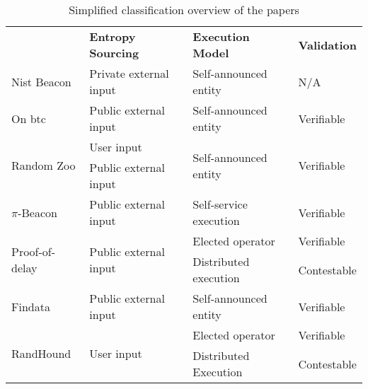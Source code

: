 \begin{table}[htbp]
    \centering
    \caption{Simplified classification overview of the papers}
    \label{tab:paper_overview}
    \begin{tabular}{@{}llll@{}}
                               & \textbf{Entropy Sourcing}              & \textbf{Execution Model}               & \textbf{Validation}        \\
Nist Beacon                    & Private external input                 & Self-announced entity                  & N/A                \\\midrule
On btc                         & Public external input                  & Self-announced entity                  & Verifiable         \\\midrule
\multirow{2}{*}{Random Zoo}    & User input                             & \multirow{2}{*}{Self-announced entity} & \multirow{2}{*}{Verifiable}         \\
                               & Public external input                  &                                        &                    \\\midrule
$\pi$-Beacon                   & Public external input                  & Self-service execution                 & Verifiable         \\\midrule
\multirow{2}{*}{Proof-of-delay}& \multirow{2}{*}{Public external input} & Elected operator                       & Verifiable   \\
                               &                                        & Distributed execution                  & Contestable  \\\midrule
Findata                        & Public external input                  & Self-announced entity                  & Verifiable   \\\midrule
\multirow{2}{*}{RandHound}     & \multirow{2}{*}{User input}            & Elected operator                       & Verifiable   \\
                               &                                        & Distributed Execution                  & Contestable
    \end{tabular}
\end{table}

